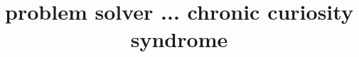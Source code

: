 \documentclass[11pt,a4paper,sans]{moderncv}                  %
\title{problem solver ... chronic curiosity syndrome}
\begin{document}
\makecvtitle


\end{document}

